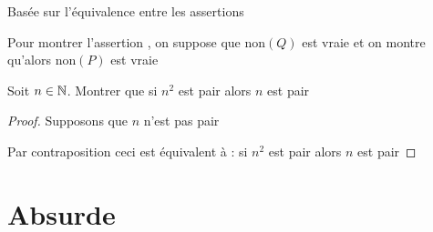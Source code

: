 \begin{frame}


Basée sur l'équivalence entre les assertions

\pause

Pour montrer l'assertion , 
on suppose que $\text{non}(Q)$ est vraie et on montre qu'alors $\text{non}(P)$ est vraie

\pause

\begin{exemple}
Soit $n \in \mathbb{N}$. Montrer que si $n^2$ est pair alors $n$ est pair
\end{exemple}

\pause

\begin{proof}
Supposons que $n$ n'est pas pair

\medskip

\pause



\pause\pause
Par contraposition ceci est équivalent à : si $n^2$ est pair alors $n$ est pair
\end{proof}

\end{frame}


\section{Absurde}

